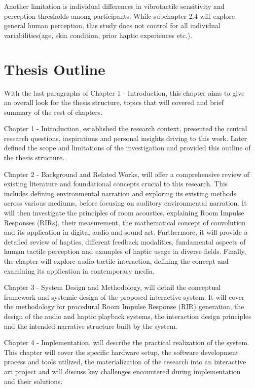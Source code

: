     Another limitation is individual differences in vibrotactile sensitivity and perception thresholds among participants. While subchapter 2.4 will explore general human perception, this study does not control for all individual variabilities(age, skin condition, prior haptic experiences etc.).\par
    \section{Thesis Outline}
    With the last paragraphs of Chapter 1 - Introduction, this chapter aims to give an overall look for the thesis structure, topics that will covered and brief summary of the rest of chapters.\par

    Chapter 1 - Introduction, established the research context, presented the central research questions, inspirations and personal insights driving to this work. Later defined the scope and limitations of the investigation and provided this outline of the thesis structure.\par

    Chapter 2 - Background and Related Works, will offer a comprehensive review of existing literature and foundational concepts crucial to this research. This includes defining environmental narration and exploring its existing methods across various mediums, before focusing on auditory environmental narration. It will then investigate the principles of room acoustics, explaining Room Impulse Responses (RIRs), their measurement, the mathematical concept of convolution and its application in digital audio and sound art. Furthermore, it will provide a detailed review of haptics, different feedback modalities, fundamental aspects of human tactile perception and examples of haptic usage in diverse fields. Finally, the chapter will explore audio-tactile interaction, defining the concept and examining its application in contemporary media.\par

    Chapter 3 - System Design and Methodology, will detail the conceptual framework and systemic design of the proposed interactive system. It will cover the methodology for procedural Room Impulse Response (RIR) generation, the design of the audio and haptic playback systems, the interaction design principles and the intended narrative structure built by the system.\par

    Chapter 4 - Implementation, will describe the practical realization of the system. This chapter will cover the specific hardware setup, the software development process and tools utilized, the materialization of the research into an interactive art project and will discuss key challenges encountered during implementation and their solutions.\par

